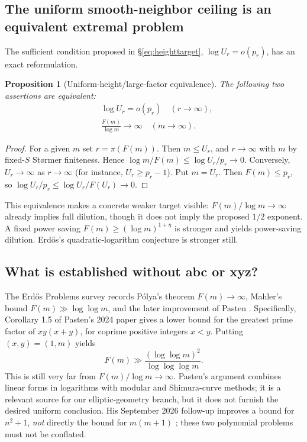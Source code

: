 \documentclass[11pt,letterpaper]{article}
\newtheorem{proposition}[conjecture]{Proposition}
\theoremstyle{remark}
\begin{document}
\subsection{The uniform smooth-neighbor ceiling is an equivalent extremal problem}
The sufficient condition proposed in \S\ref{eq:heighttarget},
$\log U_r=o(p_r)$, has an exact reformulation.
\begin{proposition}[Uniform-height/large-factor equivalence]
\label{prop:equivalence}
The following two assertions are equivalent:
\begin{align*}
&\log U_r=o(p_r) \quad (r\to\infty),\\
&\frac{F(m)}{\log m}\longrightarrow\infty \quad(m\to\infty).
\end{align*}
\end{proposition}
\begin{proof}
For a given $m$ set $r=\pi(F(m))$. Then $m\le U_r$, and
$r\to\infty$ with $m$ by fixed-$S$ St\o rmer finiteness.
Hence $\log m/F(m)\le\log U_r/p_r\to0$.
Conversely, $U_r\to\infty$ as $r\to\infty$ (for instance,
$U_r\ge p_r-1$). Put $m=U_r$. Then $F(m)\le p_r$, so
$\log U_r/p_r\le\log U_r/F(U_r)\to0$.
\end{proof}

This equivalence makes a concrete weaker target visible:
$F(m)/\log m\to\infty$ already implies full dilution, though
it does not imply the proposed $1/2$ exponent. A fixed power
saving $F(m)\ge(\log m)^{1+\eta}$ is stronger and yields
power-saving dilution. Erd\H{o}s's quadratic-logarithm conjecture
is stronger still.

\subsection{What is established without abc or xyz?}
The Erd\H{o}s Problems survey records P\'olya's theorem
$F(m)\to\infty$, Mahler's bound $F(m)\gg\log\log m$,
and the later improvement of Pasten \cite{Erdos368,Pasten2024}.
Specifically, Corollary 1.5 of Pasten's 2024 paper gives a lower
bound for the greatest prime factor of $xy(x+y)$, for coprime
positive integers $x<y$. Putting $(x,y)=(1,m)$ yields
\[
 F(m)\gg\frac{(\log\log m)^2}{\log\log\log m}.
\]
This is still very far from $F(m)/\log m\to\infty$.
Pasten's argument combines linear forms in logarithms with
modular and Shimura-curve methods; it is a relevant source for
our elliptic-geometry branch, but it does not furnish the desired
uniform conclusion. His September 2026 follow-up improves a
bound for $n^2+1$, \emph{not} directly the bound for $m(m+1)$
\cite{Pasten2026}; these two polynomial problems must not be conflated.
\end{document}
